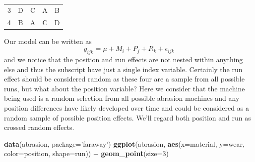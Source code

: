 \documentclass[]{book}
\newenvironment{Shaded}{\begin{snugshade}}{\end{snugshade}}
\newcommand{\KeywordTok}[1]{\textcolor[rgb]{0.13,0.29,0.53}{\textbf{{#1}}}}
\newcommand{\DataTypeTok}[1]{\textcolor[rgb]{0.13,0.29,0.53}{{#1}}}
\newcommand{\DecValTok}[1]{\textcolor[rgb]{0.00,0.00,0.81}{{#1}}}
\newcommand{\StringTok}[1]{\textcolor[rgb]{0.31,0.60,0.02}{{#1}}}
\newcommand{\NormalTok}[1]{{#1}}
\theoremstyle{definition}
\theoremstyle{definition}
\theoremstyle{remark}
\begin{document}
\begin{longtable}[]{@{}ccccc@{}}
\begin{minipage}[t]{0.07\columnwidth}
3\strut
\end{minipage} & \begin{minipage}[t]{0.17\columnwidth}\centering\strut
D\strut
\end{minipage} & \begin{minipage}[t]{0.17\columnwidth}\centering\strut
C\strut
\end{minipage} & \begin{minipage}[t]{0.17\columnwidth}\centering\strut
A\strut
\end{minipage} & \begin{minipage}[t]{0.17\columnwidth}\centering\strut
B\strut
\end{minipage}\tabularnewline
\begin{minipage}[t]{0.07\columnwidth}\centering\strut
4\strut
\end{minipage} & \begin{minipage}[t]{0.17\columnwidth}\centering\strut
B\strut
\end{minipage} & \begin{minipage}[t]{0.17\columnwidth}\centering\strut
A\strut
\end{minipage} & \begin{minipage}[t]{0.17\columnwidth}\centering\strut
C\strut
\end{minipage} & \begin{minipage}[t]{0.17\columnwidth}\centering\strut
D\strut
\end{minipage}\tabularnewline
\bottomrule
\end{longtable}

Our model can be written as
\[y_{ijk}=\mu+M_{i}+P_{j}+R_{k}+\epsilon_{ijk}\] and we notice that the
position and run effects are not nested within anything else and thus
the subscript have just a single index variable. Certainly the run
effect should be considered random as these four are a sample from all
possible runs, but what about the position variable? Here we consider
that the machine being used is a random selection from all possible
abrasion machines and any position differences have likely developed
over time and could be considered as a random sample of possible
position effects. We'll regard both position and run as crossed random
effects.

\begin{Shaded}
\begin{Highlighting}[]
\KeywordTok{data}\NormalTok{(abrasion, }\DataTypeTok{package=}\StringTok{'faraway'}\NormalTok{)}
\KeywordTok{ggplot}\NormalTok{(abrasion, }\KeywordTok{aes}\NormalTok{(}\DataTypeTok{x=}\NormalTok{material, }\DataTypeTok{y=}\NormalTok{wear, }\DataTypeTok{color=}\NormalTok{position, }\DataTypeTok{shape=}\NormalTok{run)) +}
\StringTok{  }\KeywordTok{geom_point}\NormalTok{(}\DataTypeTok{size=}\DecValTok{3}\NormalTok{)}
\end{Highlighting}
\end{Shaded}
\end{document}
